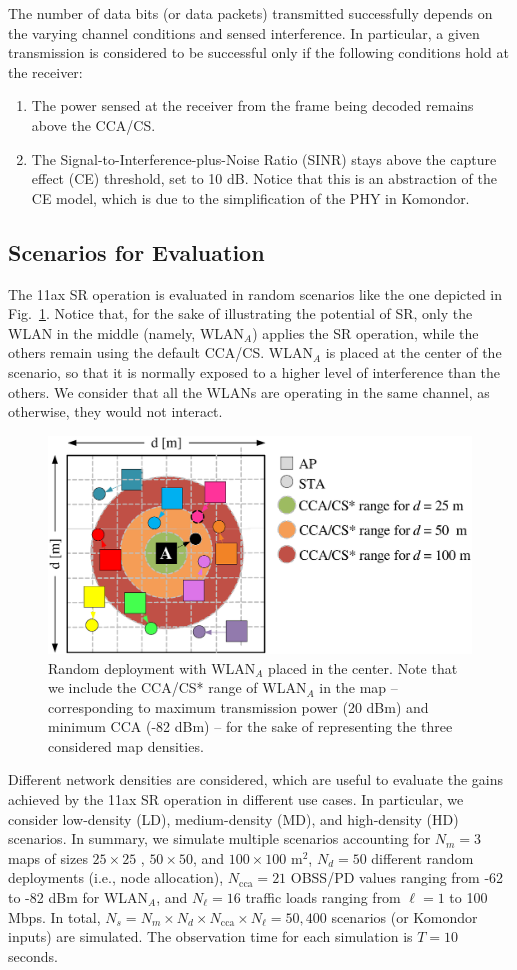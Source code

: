 \documentclass{article}
\begin{document}
	The number of data bits (or data packets) transmitted successfully depends on the varying channel conditions and sensed interference. In particular, a given transmission is considered to be successful only if the following conditions hold at the receiver:
	\begin{enumerate}
		\item The power sensed at the receiver from the frame being decoded remains above the CCA/CS.
		\item The Signal-to-Interference-plus-Noise Ratio (SINR) stays above the capture effect (CE) threshold, set to 10 dB. Notice that this is an abstraction of the CE model, which is due to the simplification of the PHY in Komondor.
	\end{enumerate}
	
	\subsection{Scenarios for Evaluation}
	The 11ax SR operation is evaluated in random scenarios like the one depicted in Fig.~\ref{fig:random_scenario}. Notice that, for the sake of illustrating the potential of SR, only the WLAN in the middle (namely, WLAN$_A$) applies the SR operation, while the others remain using the default CCA/CS. WLAN$_A$ is placed at the center of the scenario, so that it is normally exposed to a higher level of interference than the others. We consider that all the WLANs are operating in the same channel, as otherwise, they would not interact.
	
	\begin{figure}[ht!]
		\centering
		\includegraphics[width=.6\columnwidth]{map_central}
		\caption{Random deployment with WLAN$_A$ placed in the center. Note that we include the CCA/CS* range of WLAN$_A$ in the map -- corresponding to maximum transmission power (20 dBm) and minimum CCA (-82 dBm) -- for the sake of representing the three considered map densities.}
		\label{fig:random_scenario}
	\end{figure}
	
	Different network densities are considered, which are useful to evaluate the gains achieved by the 11ax SR operation in different use cases. In particular, we consider low-density (LD), medium-density (MD), and high-density (HD) scenarios. In summary, we simulate multiple scenarios accounting for $N_m = 3$ maps of sizes $25 \times 25$ , $50 \times 50$, and $100 \times 100$ m$^2$, $N_d = 50$ different random deployments (i.e., node allocation), $N_\text{cca} = 21$ OBSS/PD values ranging from -62 to -82 dBm for WLAN$_A$, and $N_\ell = 16$ traffic loads ranging from $\ell = 1$ to 100 Mbps. In total, $N_s =  N_m \times N_d \times N_\text{cca} \times N_\ell = 50,400$ scenarios (or Komondor inputs) are simulated. The observation time for each simulation is $T = 10$ seconds.
	
\end{document}
